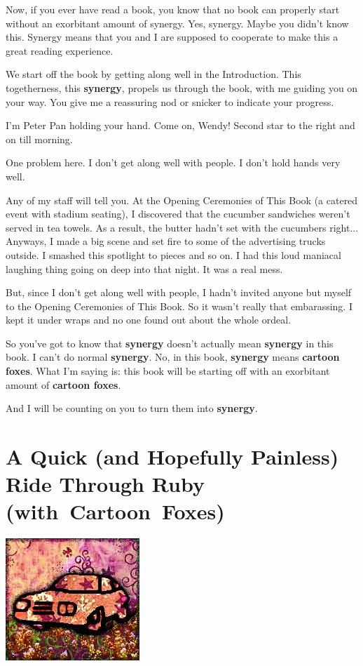 \documentclass[10pt,twoside]{report}
\begin{document}
Now, if you ever have read a book, you know that no book can properly
start without an exorbitant amount of synergy.  Yes, synergy.  Maybe
you didn't know this.  Synergy means that you and I are supposed to
cooperate to make this a great reading experience.

We start off the book by getting along well in the Introduction.  This
togetherness, this {\bf synergy}, propels us through the book, with me
guiding you on your way.  You give me a reassuring nod or snicker to
indicate your progress.

I'm Peter Pan holding your hand.  Come on, Wendy!  Second star to the
right and on till morning.

One problem here.  I don't get along well with people.  I don't hold
hands very well.

Any of my staff will tell you.  At the Opening Ceremonies of This Book
(a catered event with stadium seating), I discovered that the cucumber
sandwiches weren't served in tea towels. As a result, the butter
hadn't set with the cucumbers right... Anyways, I made a big scene and
set fire to some of the advertising trucks outside.  I smashed this
spotlight to pieces and so on.  I had this loud maniacal laughing
thing going on deep into that night.  It was a real mess.

But, since I don't get along well with people, I hadn't invited anyone
but myself to the Opening Ceremonies of This Book.  So it wasn't
really that embarassing.  I kept it under wraps and no one found out
about the whole ordeal.

So you've got to know that {\bf synergy} doesn't actually mean {\bf
  synergy} in this book.  I can't do normal {\bf synergy}. No, in this
book, {\bf synergy} means {\bf cartoon foxes}.  What I'm saying is:
this book will be starting off with an exorbitant amount of {\bf
  cartoon foxes}.

And I will be counting on you to turn them into {\bf synergy}.

\newpage
\thispagestyle{empty}
\mbox{}

\cleartooddpage

\chapter{A Quick (and Hopefully Painless) Ride Through Ruby \mbox{(with Cartoon Foxes)}}
\vfill
\begin{center}
  \includegraphics{cache/chapterpoignantguide3.png}
\end{center}
\vspace{2cm}
\newpage
\thispagestyle{empty}
\mbox{}
\clearpage
\end{document}
